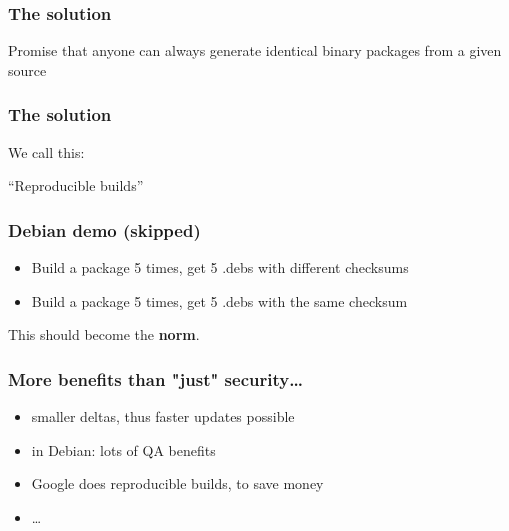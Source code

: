 \documentclass[14pt]{beamer}
\newif\ifplacelogo
\begin{document}
\begin{frame}
 \frametitle{The solution}

 \begin{center}
 \Large{
 Promise that anyone can always generate
 identical binary packages
 from a given source}
\end{center}
\end{frame}


\begin{frame}
 \frametitle{The solution}

 \begin{center}
 We call this:

 \Huge{ “Reproducible builds” }
 \end{center}
\end{frame}

\placelogotrue

\begin{frame}
 \frametitle{Debian demo (skipped)}
 \begin{itemize}
 \item Build a package 5 times, get 5 .debs with different checksums
 \item Build a package 5 times, get 5 .debs with the same checksum\\
 \end{itemize}
%
%
\end{frame}

\placelogofalse

\begin{frame}[plain]
\begin{center}
 \Huge{This should become the \textbf{norm}.}

\end{center}
\end{frame}

\begin{frame}[fragile]
 \frametitle{More benefits than "just" security…}
 \begin{itemize}
  \item smaller deltas, thus faster updates possible
  \item in Debian: lots of QA benefits
  \item Google does reproducible builds, to save money
  \item …
 \end{itemize}
\end{frame}
\end{document}
